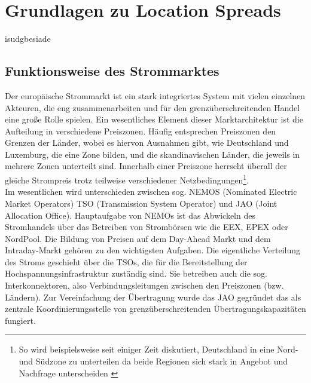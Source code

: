\section{Grundlagen zu Location Spreads}
\label{sec:Grundlagen zu Location Spreads}

isudgbesiade

\subsection{Funktionsweise des Strommarktes}
\label{sec:Funktionsweise des Strommarktes}
Der europäische Strommarkt ist ein stark integriertes System mit vielen einzelnen Akteuren, die eng zusammenarbeiten und für den grenzüberschreitenden Handel eine große Rolle spielen. Ein wesentliches Element dieser Marktarchitektur ist die Aufteilung in verschiedene Preiszonen. Häufig entsprechen Preiszonen den Grenzen der Länder, wobei es hiervon Ausnahmen gibt, wie Deutschland und Luxemburg, die eine Zone bilden, und die skandinavischen Länder, die jeweils in mehrere Zonen unterteilt sind. Innerhalb einer Preiszone herrscht überall der gleiche Strompreis trotz teilweise verschiedener Netzbedingungen\footnote{So wird beispielsweise seit einiger Zeit diskutiert, Deutschland in eine Nord- und Südzone zu unterteilen da beide Regionen sich stark in Angebot und Nachfrage unterscheiden \cite{17}}.\\
Im wesentlichen wird unterschieden zwischen sog. NEMOS (Nominated Electric Market Operators) TSO (Transmission System Operator) und JAO (Joint Allocation Office). Hauptaufgabe von NEMOs ist das Abwickeln des Stromhandels über das Betreiben von Strombörsen wie die EEX, EPEX oder NordPool. Die Bildung von Preisen auf dem Day-Ahead Markt und dem Intraday-Markt gehören zu den wichtigsten Aufgaben. Die eigentliche Verteilung des Stroms geschieht über die TSOs, die für die Bereitstellung der Hochspannungsinfrastruktur zuständig sind. Sie betreiben auch die sog. Interkonnektoren, also Verbindungsleitungen zwischen den Preiszonen (bzw. Ländern). Zur Vereinfachung der Übertragung wurde das JAO gegründet das als zentrale Koordinierungsstelle von grenzüberschreitenden Übertragungskapazitäten fungiert. \\
